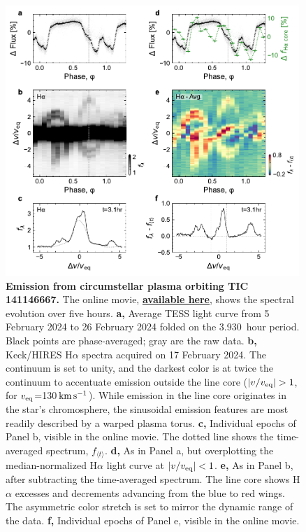 \documentclass[11pt,twocolumn,tighten,linenumbers]{aastex7}
\newcommand{\kms}{\ensuremath{\rm km\,s^{-1}}}
\newcommand{\periodhr}{3.930}
\begin{document}
\begin{figure}[!t]
  \centering
  \includegraphics[width=0.99\textwidth]{f3.pdf}
  \vspace{-0.25cm}
  \captionsetup{labelformat=moviefmt,labelsep=colon}
	\caption{\textbf{Emission from circumstellar plasma orbiting
TIC\,141146667.}
  The online movie,
  \href{https://lgbouma.com/movies/TIC141146667_sixpanel.mp4}{{\bf
  available here}},
  shows the spectral evolution over five hours.
  {\bf a,} Average TESS light curve from 5 February 2024 to 26
  February 2024 folded on the \periodhr\ hour period.  Black
  points are phase-averaged; gray are the raw data.
  {\bf b,} Keck/HIRES H$\alpha$ spectra acquired on 17
  February 2024.  The continuum is set to unity, and the darkest color
  is at twice the continuum to accentuate emission outside the line
  core ($|v/v_{\rm eq}|>1$, for $v_{\rm eq}$=130\,\kms).  While
  emission in the line core originates in the star's chromosphere,
  the sinusoidal emission features are most readily described by a
  warped plasma torus.
  {\bf c,} Individual epochs of Panel b, visible in the
  online movie.  The dotted line shows the time-averaged spectrum,
  $f_{\langle t \rangle}$.
  {\bf d,} As in Panel a, but overplotting the
  median-normalized H$\alpha$ light curve at $|v/v_{\rm eq}|<1$.
  {\bf e,} As in Panel b, after subtracting the time-averaged
  spectrum.  The line core shows H$\alpha$ excesses and decrements
  advancing from the blue to red wings.
  The asymmetric color stretch
  is set to mirror the dynamic range of the data.
  {\bf f,} Individual epochs of Panel e, visible in the online
  movie.}
  \label{fig:spec}
\end{figure}
\end{document}
